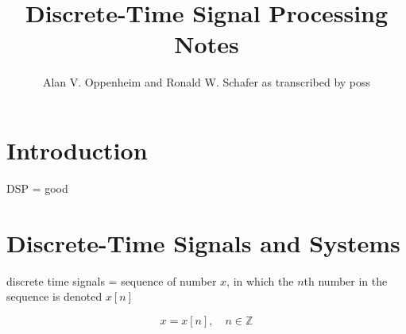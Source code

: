 \documentclass{article}
\title{Discrete-Time Signal Processing Notes}
\author{Alan V. Oppenheim and Ronald W. Schafer as transcribed by poss}
\begin{document}
\maketitle{}

\section{Introduction}

DSP = good

\section{Discrete-Time Signals and Systems}

discrete time signals = sequence of number \(x\), in which the \(n\)th number in the sequence is denoted \(x[n]\)

\[
	x = {x[n]}, \quad n \in \mathbb{Z} 
\]
\end{document}
